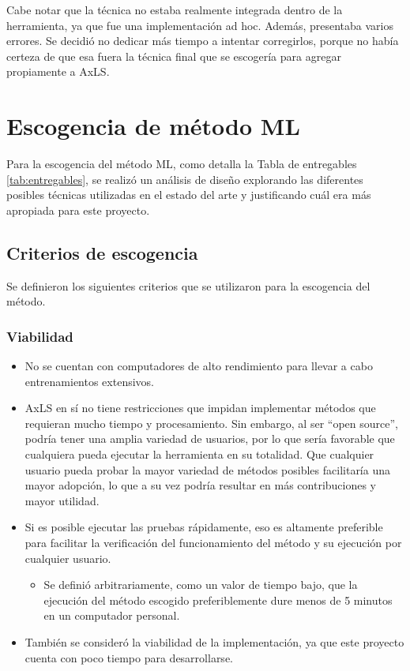 Cabe notar que la técnica no estaba realmente integrada dentro de la
herramienta, ya que fue una implementación ad hoc. Además, presentaba varios
errores. Se decidió no dedicar más tiempo a intentar corregirlos, porque no
había certeza de que esa fuera la técnica final que se escogería para agregar
propiamente a AxLS.

\section{Escogencia de método ML}

Para la escogencia del método ML, como detalla la Tabla de entregables
\ref{tab:entregables}, se realizó un análisis de diseño explorando las
diferentes posibles técnicas utilizadas en el estado del arte y justificando
cuál era más apropiada para este proyecto.

\subsection{Criterios de escogencia}

Se definieron los siguientes criterios que se utilizaron para la escogencia del
método.

\subsubsection{Viabilidad}
\begin{itemize}
    \item No se cuentan con computadores de alto rendimiento para llevar a cabo
      entrenamientos extensivos.
    \item AxLS en sí no tiene restricciones que impidan implementar métodos que
      requieran mucho tiempo y procesamiento. Sin embargo, al ser ``open source'',
      podría tener una amplia variedad de usuarios, por lo que sería favorable
      que cualquiera pueda ejecutar la herramienta en su totalidad. Que
      cualquier usuario pueda probar la mayor variedad de métodos posibles
      facilitaría una mayor adopción, lo que a su vez podría resultar en más
      contribuciones y mayor utilidad.
     \item Si es posible ejecutar las pruebas rápidamente, eso es altamente
       preferible para facilitar la verificación del funcionamiento del método
       y su ejecución por cualquier usuario.
    \begin{itemize}
        \item Se definió arbitrariamente, como un valor de tiempo bajo, que la
          ejecución del método escogido preferiblemente dure menos de 5 minutos
          en un computador personal.
    \end{itemize}

  \item También se consideró la viabilidad de la implementación, ya que este
    proyecto cuenta con poco tiempo para desarrollarse.
\end{itemize}

